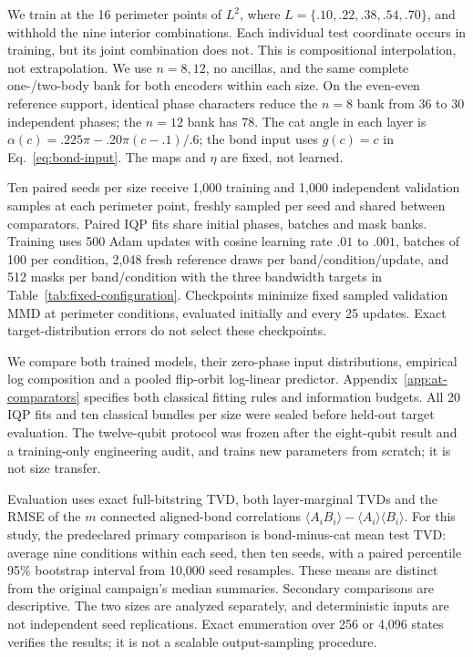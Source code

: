 \documentclass[pra,aps,10pt,twocolumn,floatfix,superscriptaddress,
notitlepage,longbibliography]{revtex4-2}
\begin{document}
We train at the 16 perimeter points of $L^2$, where $L=\{.10,.22,.38,.54,.70\}$, and withhold the nine interior combinations. Each individual test coordinate occurs in training, but its joint combination does not. This is compositional interpolation, not extrapolation. We use $n=8,12$, no ancillas, and the same complete one-/two-body bank for both encoders within each size. On the even-even reference support, identical phase characters reduce the $n=8$ bank from 36 to 30 independent phases; the $n=12$ bank has 78. The cat angle in each layer is $\alpha(c)=.225\pi-.20\pi(c-.1)/.6$; the bond input uses $g(c)=c$ in Eq.~\eqref{eq:bond-input}. The maps and $\eta$ are fixed, not learned.

Ten paired seeds per size receive 1,000 training and 1,000 independent validation samples at each perimeter point, freshly sampled per seed and shared between comparators. Paired IQP fits share initial phases, batches and mask banks. Training uses 500 Adam updates with cosine learning rate $.01$ to $.001$, batches of 100 per condition, 2,048 fresh reference draws per band/condition/update, and 512 masks per band/condition with the three bandwidth targets in Table~\ref{tab:fixed-configuration}. Checkpoints minimize fixed sampled validation MMD at perimeter conditions, evaluated initially and every 25 updates. Exact target-distribution errors do not select these checkpoints.

We compare both trained models, their zero-phase input distributions, empirical log composition and a pooled flip-orbit log-linear predictor. Appendix~\ref{app:at-comparators} specifies both classical fitting rules and information budgets. All 20 IQP fits and ten classical bundles per size were sealed before held-out target evaluation. The twelve-qubit protocol was frozen after the eight-qubit result and a training-only engineering audit, and trains new parameters from scratch; it is not size transfer.

Evaluation uses exact full-bitstring TVD, both layer-marginal TVDs and the RMSE of the $m$ connected aligned-bond correlations $\langle A_iB_i\rangle-\langle A_i\rangle\langle B_i\rangle$. For this study, the predeclared primary comparison is bond-minus-cat mean test TVD: average nine conditions within each seed, then ten seeds, with a paired percentile 95\% bootstrap interval from 10,000 seed resamples. These means are distinct from the original campaign's median summaries. Secondary comparisons are descriptive. The two sizes are analyzed separately, and deterministic inputs are not independent seed replications. Exact enumeration over 256 or 4,096 states verifies the results; it is not a scalable output-sampling procedure.
\end{document}
